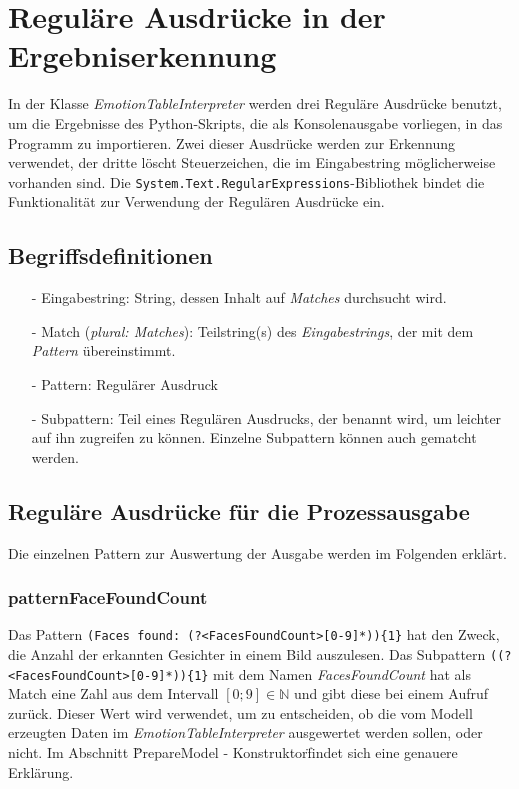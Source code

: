 \documentclass[10pt,a4paper]{report}
\begin{document}
\section{Regul\"{a}re Ausdr\"{u}cke in der Ergebniserkennung}
In der Klasse \textit{EmotionTableInterpreter} werden drei Regul\"{a}re Ausdr\"{u}cke benutzt, um die Ergebnisse des Python-Skripts, die als Konsolenausgabe vorliegen, in das Programm zu importieren. Zwei dieser Ausdr\"{u}cke werden zur Erkennung verwendet, der dritte l\"{o}scht Steuerzeichen, die im Eingabestring m\"{o}glicherweise vorhanden sind. Die \texttt{System.Text.RegularExpressions}-Bibliothek bindet die Funktionalit\"{a}t zur Verwendung der Regul\"{a}ren Ausdr\"{u}cke ein.
\subsection{Begriffsdefinitionen}
\begin{itemize}
\item[-] Eingabestring: String, dessen Inhalt auf \textit{Matches} durchsucht wird.
\item[-] Match (\textit{plural: Matches}): Teilstring(s) des \textit{Eingabestrings}, der mit dem \textit{Pattern} \"{u}bereinstimmt.
\item[-] Pattern: Regul\"{a}rer Ausdruck
\item[-] Subpattern: Teil eines Regul\"{a}ren Ausdrucks, der benannt wird, um leichter auf ihn zugreifen zu k\"{o}nnen. Einzelne Subpattern k\"{o}nnen auch gematcht werden. 
\end{itemize}
\subsection{Regul\"{a}re Ausdr\"{u}cke f\"{u}r die Prozessausgabe}
Die einzelnen Pattern zur Auswertung der Ausgabe werden im Folgenden erkl\"{a}rt.
\subsubsection{patternFaceFoundCount}
Das Pattern \texttt{(Faces found:  (?<FacesFoundCount>[0-9]*))\{1\}} hat den Zweck, die Anzahl der erkannten Gesichter in einem Bild auszulesen. Das Subpattern \texttt{((?<FacesFoundCount>[0-9]*))\{1\}} mit dem Namen \textit{FacesFoundCount} hat als Match eine Zahl aus dem Intervall $\left[0;9\right] \in \mathbb{N}$ und gibt diese bei einem Aufruf zur\"{u}ck. Dieser Wert wird verwendet, um zu entscheiden, ob die vom Modell erzeugten Daten im \textit{EmotionTableInterpreter} ausgewertet werden sollen, oder nicht. Im Abschnitt \"PrepareModel - Konstruktor\" findet sich eine genauere Erkl\"{a}rung.
\end{document}
